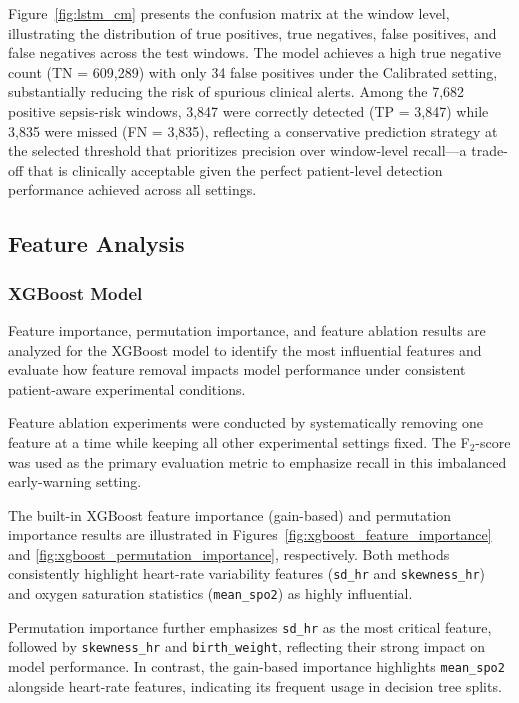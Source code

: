 \documentclass[conference]{IEEEtran}
\begin{document}
Figure~\ref{fig:lstm_cm} presents the confusion matrix 
at the window level, illustrating the distribution of 
true positives, true negatives, false positives, and 
false negatives across the test windows. The model 
achieves a high true negative count (TN = 609,289) with 
only 34 false positives under the Calibrated setting, 
substantially reducing the risk of spurious clinical 
alerts. Among the 7,682 positive sepsis-risk windows, 
3,847 were correctly detected (TP = 3,847) while 3,835 
were missed (FN = 3,835), reflecting a conservative 
prediction strategy at the selected threshold that 
prioritizes precision over window-level recall—a 
trade-off that is clinically acceptable given the 
perfect patient-level detection performance achieved 
across all settings.




  
\FloatBarrier   


\subsection{Feature Analysis}

\subsubsection{XGBoost Model}

Feature importance, permutation importance, and feature ablation results are analyzed for the XGBoost model to identify the most influential features and evaluate how feature removal impacts model performance under consistent patient-aware experimental conditions.

Feature ablation experiments were conducted by systematically removing one feature at a time while keeping all other experimental settings fixed. The F$_2$-score was used as the primary evaluation metric to emphasize recall in this imbalanced early-warning setting.

The built-in XGBoost feature importance (gain-based) and permutation importance results are illustrated in Figures~\ref{fig:xgboost_feature_importance} and \ref{fig:xgboost_permutation_importance}, respectively. Both methods consistently highlight heart-rate variability features (\texttt{sd\_hr} and \texttt{skewness\_hr}) and oxygen saturation statistics (\texttt{mean\_spo2}) as highly influential.

Permutation importance further emphasizes \texttt{sd\_hr} as the most critical feature, followed by \texttt{skewness\_hr} and \texttt{birth\_weight}, reflecting their strong impact on model performance. In contrast, the gain-based importance highlights \texttt{mean\_spo2} alongside heart-rate features, indicating its frequent usage in decision tree splits.
\end{document}
